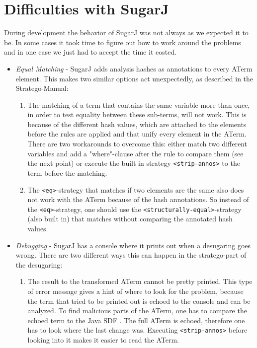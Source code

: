\documentclass{report}
\begin{document}
\section{Difficulties with SugarJ}
\label{difficultiesSugarJ}
During development the behavior of SugarJ was not always as we expected it to be. In some cases it took time to figure out how to work around the problems and in one case we just had to accept the time it costed.
\begin{itemize}
\item \emph{Equal Matching} - SugarJ adds analysis hashes as annotations to every ATerm element. This makes two similar options act unexpectedly, as described in the Stratego-Manual\cite{Stratego-Manual}:
\begin{enumerate}
 \item The matching of a term that contains the same variable more than once, in order to test equality between these sub-terms, will not work. This is because of the different hash values, which are attached to the elements before the rules are applied and that unify every element in the ATerm. There are two workarounds to overcome this: either match  two different variables and add a "where"-clause after the rule to compare them (see the next point) or execute the built in strategy \lstinline{<strip-annos>} to the term before the matching.
 \item The \lstinline{<eq>}-strategy that matches if two elements are the same also does not work with the ATerm because of the hash annotations.  So instead of the \lstinline{<eq>}-strategy, one should use the \lstinline{<structurally-equal>}-strategy (also built in) that matches without comparing the annotated hash values.
\end{enumerate}
\item \emph{Debugging} - SugarJ has a console where it prints out when a desugaring goes wrong. There are two different ways this can happen in the stratego-part of the desugaring:
\begin{enumerate}
 \item The result to the transformed ATerm cannot be pretty printed. This type of error message gives a hint of where to look for the problem, because the term that tried to be printed out is echoed to the console and can be analyzed. To find malicious parts of the ATerm, one has to compare the echoed term to the Java SDF \cite{Java-SDF-2014}. The full ATerm is echoed, therefore one has to look where the last change was. Executing \lstinline{<strip-annos>} before looking into it makes it easier to read the ATerm.

\end{enumerate}
\end{itemize}
\end{document}
